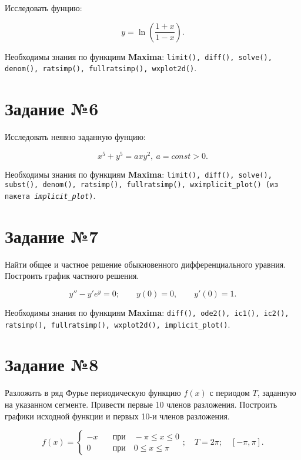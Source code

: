     Исследовать фунцию:

    \[
        y = \ln \left( \frac{1 + x}{1 - x} \right).
    \]
    
    Необходимы знания по функциям \textbf{Maxima}: {\tt limit(), diff(), solve(), denom(), ratsimp(), fullratsimp(), wxplot2d()}.

\section*{Задание №6}

	Исследовать неявно заданную фунцию:

	\[
		x^{5} + y^{5} = a x y^{2}, \: a = const > 0.
	\]

	Необходимы знания по функциям \textbf{Maxima}: {\tt limit(), diff(), solve(), subst(), denom(), ratsimp(), fullratsimp(), wximplicit\_plot() (из пакета \textit{implicit\_plot})}.

\section*{Задание №7}
    
    Найти общее и частное решение обыкновенного дифференциального уравния. Построить график частного решения.

    \[
        y'' - y' e^{y} = 0; \qquad y(0) = 0, \qquad y'(0) = 1.
    \]

	Необходимы знания по функциям \textbf{Maxima}: {\tt diff(), ode2(), ic1(), ic2(), ratsimp(), fullratsimp(), wxplot2d(), implicit\_plot()}.

\section*{Задание №8}
    
    Разложить в ряд Фурье периодическую функцию $f(x)$ с периодом $T$, заданную на указанном сегменте. Привести первые 10 членов разложения. Построить графики исходной функции и первых 10-и членов разложения.

    \[
        f(x) =
            \begin{cases}
                - x \quad &\mbox{при} \quad -\pi \leq x \leq 0\\
                0 \quad &\mbox{при} \quad 0 \leq x \leq \pi
            \end{cases}; \quad T = 2 \pi; \quad [-\pi, \pi].
    \]

%
%
%
    
